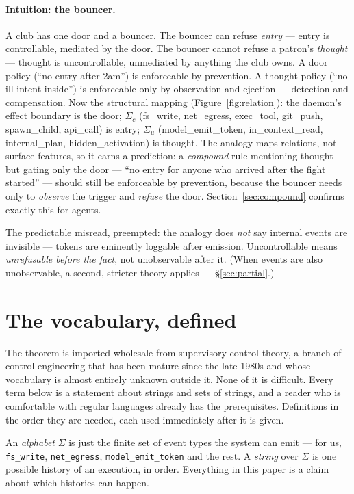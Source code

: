 \documentclass[11pt,a4paper]{article}  \usepackage{mdframed} \usepackage{graphicx}
\begin{document}
\paragraph{Intuition: the bouncer.} A club has one door and a bouncer. The bouncer can refuse \emph{entry} --- entry is
controllable, mediated by the door. The bouncer cannot refuse a patron's \emph{thought} --- thought is uncontrollable,
unmediated by anything the club owns. A door policy (``no entry after 2am'') is enforceable by prevention. A thought policy
(``no ill intent inside'') is enforceable only by observation and ejection --- detection and compensation. Now the structural
mapping (Figure~\ref{fig:relation}): the daemon's effect boundary is the door; $\Sigma_c$ (fs\_write, net\_egress,
exec\_tool, git\_push, spawn\_child, api\_call) is entry; $\Sigma_u$ (model\_emit\_token, in\_context\_read, internal\_plan,
hidden\_activation) is thought.
The analogy maps relations, not surface features, so it earns a prediction: a \emph{compound} rule mentioning thought but
gating only the door --- ``no entry for anyone who arrived after the fight started'' --- should still be enforceable by
prevention, because the bouncer needs only to \emph{observe} the trigger and \emph{refuse} the door.
Section~\ref{sec:compound} confirms exactly this for agents.

The predictable misread, preempted: the analogy does \emph{not} say internal events are invisible --- tokens are eminently
loggable after emission. Uncontrollable means \emph{unrefusable before the fact}, not unobservable after it. (When events are
also unobservable, a second, stricter theory applies --- \S\ref{sec:partial}.)



\section{The vocabulary, defined}\label{sec:vocab} The theorem is imported wholesale from supervisory control theory, a
branch of control engineering that has been mature since the late 1980s and whose vocabulary is almost entirely unknown
outside it. None of it is difficult. Every term below is a statement about strings and sets of strings, and a reader who is
comfortable with regular languages already has the prerequisites. Definitions in the order they are needed, each used
immediately after it is given.

An \emph{alphabet} $\Sigma$ is just the finite set of event types the system can emit --- for us, \texttt{fs\_write},
\texttt{net\_egress}, \texttt{model\_emit\_token} and the rest. A \emph{string} over $\Sigma$ is one possible history of an
execution, in order. Everything in this paper is a claim about which histories can happen.
\end{document}
